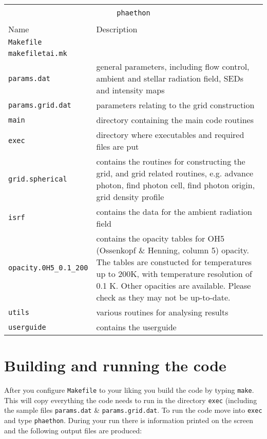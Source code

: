 \documentclass[12pt,a4paper]{article}
\begin{document}
\vspace{1cm}
{\centering 
\begin{tabular}{|p{4cm}|p{13.1cm}|}
\hline
\multicolumn{2}{|c|}{}\\ 
\multicolumn{2}{|c|}{\large\texttt{phaethon}}\\
\multicolumn{2}{|c|}{}\\  
\hline
Name & Description \\
\hline
\texttt{Makefile} & \\
\texttt{makefiletai.mk}&  \\
\texttt{params.dat}& general parameters, including flow control, ambient and stellar radiation field, SEDs and intensity maps\\
\texttt{params.grid.dat}& parameters relating to the grid construction \\
\texttt{main}& directory containing the main code routines\\
\texttt{exec}& directory where executables and required files are put\\
\texttt{grid.spherical}& contains the routines for constructing the grid, and grid related routines, e.g. advance photon, find photon cell, find photon origin, grid density profile \\
\texttt{isrf}& contains the data for the ambient radiation field \\
\texttt{opacity.0H5\_0.1\_200}& contains the opacity tables for OH5 (Ossenkopf \& Henning, column 5) opacity. The tables are constucted for temperatures up to 200K, with temperature resolution of 0.1 K. Other opacities are available. Please check as they may not be up-to-date.\\
\texttt{utils}& various routines for analysing results\\
\texttt{userguide}& contains the userguide\\
\hline
\end{tabular}
\par}
\vspace{1cm}


\section{Building and running the code}

After you configure \texttt{Makefile} to your liking you  build the code by typing
{\texttt{make}}. This will copy everything the code needs to run in the directory {\texttt{exec}} (including the sample files \texttt{params.dat} \& \texttt{params.grid.dat}. To run the code move into {\texttt{exec}} and type \texttt{phaethon}. During your run there is information printed on the screen and the following output files are produced:
\end{document}
